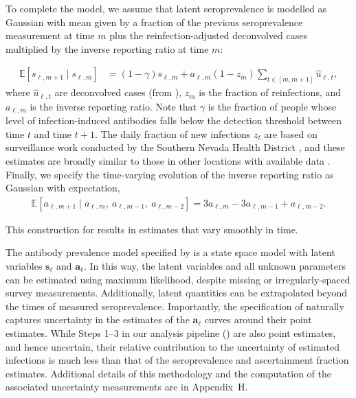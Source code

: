\begin{linenomath*}
To complete the model, we assume that latent seroprevalence is modelled as
Gaussian with mean given by a fraction of the previous seroprevalence
measurement at time $m$ plus the reinfection-adjusted deconvolved cases
multiplied by the inverse reporting ratio at time $m$:
\end{linenomath*}
\begin{linenomath*}
\begin{align}
  \label{eq:expect-sero}
\mathbb{E}[s_{\ell,m+1} \mid s_{\ell,m}] & = (1 -\gamma) s_{\ell,m} 
+ a_{\ell,m} (1 - z_{m}) \sum_{t\in[m,m+1]}\widehat{u}_{\ell,t},
\end{align}
where $\widehat{u}_{\ell,t}$ are deconvolved cases (from
), $z_{m}$ is the fraction of reinfections, and
$a_{\ell,m}$ is the inverse reporting ratio. Note that $\gamma$ is the fraction
of people whose level of infection-induced antibodies falls below the detection
threshold between time $t$ and time $t+1$. The daily fraction of new infections
$z_t$ are based on surveillance work conducted by the Southern Nevada Health
District \citep{ruff2022rapid}, and these estimates are broadly similar to those
in other locations with available data \citep{ruff2022rapid, nyreinfect2021,
hireinfect2022, wareinfect2022}. Finally, we specify the time-varying evolution
of the inverse reporting ratio as Gaussian with expectation,
\begin{align}
  \label{eq:report-ratio}
\mathbb{E}[a_{\ell,m+1} \mid a_{\ell,m},\ a_{\ell,m-1},\ a_{\ell,m-2}] = 3a_{\ell,m} - 
3a_{\ell,m-1} + a_{\ell,m-2}.
\end{align}
\end{linenomath*}
This construction for  results in estimates that vary
smoothly in time.

    
The antibody prevalence model specified by
 is a state space model with
latent variables $\mathbf{s}_{\ell}$ and $\mathbf{a}_{\ell}$. In this way, the
latent variables and all unknown parameters can be estimated using maximum
likelihood, despite missing or irregularly-spaced survey measurements.
Additionally, latent quantities can be extrapolated beyond the times of measured
seroprevalence. Importantly, the specification of
 naturally captures uncertainty
in the estimates of the $\mathbf{a}_{\ell}$ curves around their point estimates.
While Steps 1--3 in our analysis pipeline ()
are also point estimates, and hence uncertain, their relative contribution to
the uncertainty of estimated infections is much less than that of the
seroprevalence and ascertainment fraction estimates. Additional details of this
methodology and the computation of the associated uncertainty measurements are
in Appendix~H.



